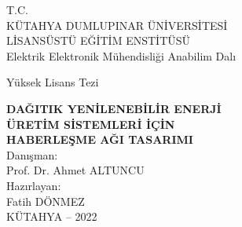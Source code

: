 \begin{titlepage}
   \begin{center}
        T.C.\\
        KÜTAHYA DUMLUPINAR ÜNİVERSİTESİ\\
        LİSANSÜSTÜ EĞİTİM ENSTİTÜSÜ\\
        Elektrik Elektronik Mühendisliği Anabilim Dalı\\
        \vspace{105 pt}



       Yüksek Lisans Tezi\\

       \vspace{114pt}
       
       {\Large \textbf {DAĞITIK YENİLENEBİLİR ENERJİ}}\\
       \vspace{9pt}
       {\Large \textbf {ÜRETİM SİSTEMLERİ İÇİN}}\\
       \vspace{9pt}
       {\Large \textbf {HABERLEŞME AĞI TASARIMI}}\\
       \vspace{105pt}
       Danışman:\\
       Prof. Dr. Ahmet ALTUNCU\\
       \vspace{100pt}
       Hazırlayan:\\
       Fatih DÖNMEZ\\
       \vspace{90pt}
       KÜTAHYA -- 2022

   \end{center}
\end{titlepage}